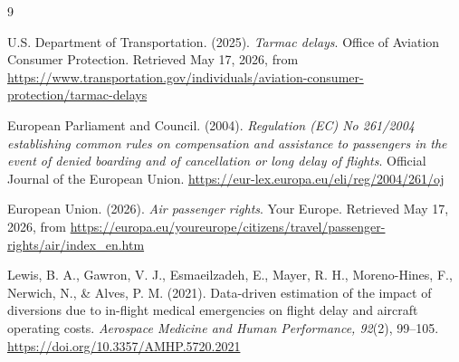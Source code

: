 \documentclass[11pt]{article}
\numberwithin{figure}{section}
\numberwithin{table}{section}
\begin{document}
\begin{thebibliography}{9}

U.S. Department of Transportation. (2025). \emph{Tarmac delays}. Office of Aviation Consumer Protection. Retrieved May 17, 2026, from \url{https://www.transportation.gov/individuals/aviation-consumer-protection/tarmac-delays}

European Parliament and Council. (2004). \emph{Regulation (EC) No 261/2004 establishing common rules on compensation and assistance to passengers in the event of denied boarding and of cancellation or long delay of flights}. Official Journal of the European Union. \url{https://eur-lex.europa.eu/eli/reg/2004/261/oj}

European Union. (2026). \emph{Air passenger rights}. Your Europe. Retrieved May 17, 2026, from \url{https://europa.eu/youreurope/citizens/travel/passenger-rights/air/index_en.htm}

Lewis, B. A., Gawron, V. J., Esmaeilzadeh, E., Mayer, R. H., Moreno-Hines, F., Nerwich, N., \& Alves, P. M. (2021). Data-driven estimation of the impact of diversions due to in-flight medical emergencies on flight delay and aircraft operating costs. \emph{Aerospace Medicine and Human Performance, 92}(2), 99--105. \url{https://doi.org/10.3357/AMHP.5720.2021}

\end{thebibliography}
\end{document}
